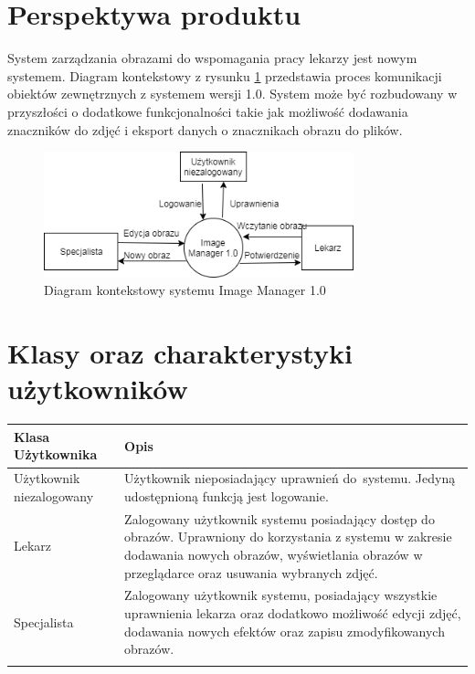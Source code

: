 \documentclass{scrreprt}
\begin{document}
\section{Perspektywa produktu}
System zarządzania obrazami do wspomagania pracy lekarzy jest nowym systemem. Diagram kontekstowy z rysunku \ref{fig:diag1} przedstawia proces komunikacji obiektów zewnętrznych z systemem wersji 1.0. System może być rozbudowany w przyszło\'sci o dodatkowe funkcjonalno\'sci takie jak możliwo\'sć dodawania znaczników do zdjęć i eksport danych o znacznikach obrazu do plików.
\begin{figure}[h]
    \centering
    \includegraphics[width=0.8\textwidth]{diagramKontekstowy.png}
    \caption{Diagram kontekstowy systemu Image Manager 1.0}
    \label{fig:diag1}
\end{figure}
\section{ Klasy oraz charakterystyki użytkowników }
\begin{center}
\begin{tabularx}{\textwidth}[h]{XX}
\arrayrulecolor{myBlue}\hline
\textbf{\textcolor{myBlue}{Klasa Użytkownika}} & 
\begin{minipage}[t]{\linewidth}%
\textbf{\textcolor{myBlue}{Opis}}
\end {minipage}\\

\hline
Użytkownik niezalogowany & 
\begin{minipage}[t]{\linewidth}%
Użytkownik nieposiadający uprawnień do~systemu. Jedyną udostępnioną funkcją jest logowanie.   
\end{minipage}\\
\arrayrulecolor{black}\hline
Lekarz & 
\begin{minipage}[t]{\linewidth}%
Zalogowany użytkownik systemu posiadający dostęp do obrazów. Uprawniony do korzystania z systemu w zakresie dodawania nowych obrazów, wy\'swietlania obrazów w przeglądarce oraz usuwania wybranych zdjęć. 
\end{minipage}\\
\arrayrulecolor{black}\hline
Specjalista & 
\begin{minipage}[t]{\linewidth}%
Zalogowany użytkownik systemu, posiadający wszystkie uprawnienia lekarza oraz dodatkowo możliwo\'sć edycji zdjęć, dodawania nowych efektów oraz zapisu zmodyfikowanych obrazów.  
\end{minipage}\\
\arrayrulecolor{black}\hline



\end{tabularx}
\end{center}
\end{document}
